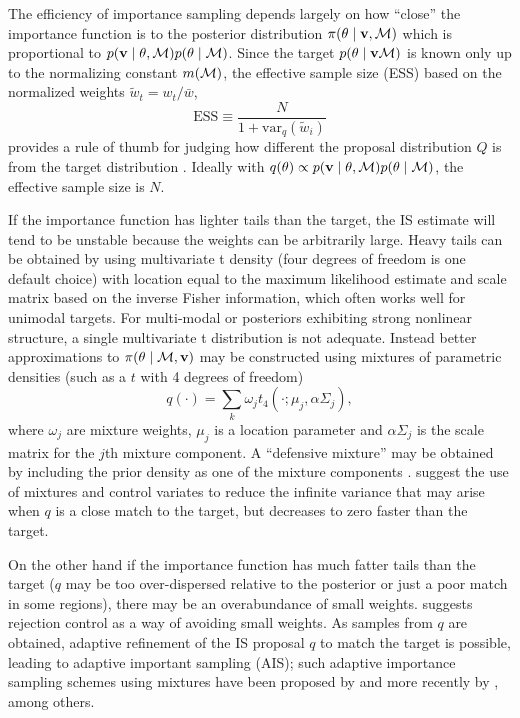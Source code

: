 The efficiency of importance sampling depends largely on how ``close'' the
importance function is to the posterior distribution $\pi(\theta \mid
\mathbf{v}, {\cal{M}})$ which is proportional to $p(\mathbf{v} \mid \theta, {\cal{M}}) p(\theta \mid
{\cal{M}})$.   Since the target $p(\theta \mid \mathbf{v}
{\cal{M}})$ is known only up to the normalizing constant $m({\cal{M}})$, the
effective sample size (ESS) based on the normalized weights
$\tilde{w}_t = w_t/ \bar{w}$,
\begin{equation}
  \label{eq:ESS}
  \text{ESS} \equiv \frac{N}{1 + \text{var}_q(\tilde{w}_i)}
\end{equation}
provides a rule of thumb for judging how different the proposal
distribution $Q$ is from the target distribution \cite[page
34]{Liu:2001}.  Ideally with $q( \theta) \propto p(\mathbf{v} \mid \theta, {\cal{M}})
p(\theta \mid {\cal{M}})$, the effective sample size is $N$.

If the importance function has lighter tails
than the target, the IS estimate will tend to be unstable because the
weights can be arbitrarily large.  Heavy tails can  be obtained
by using multivariate t density (four degrees
of freedom is one default choice) with location equal to the  maximum
likelihood  estimate and scale matrix based on the inverse Fisher
information, which often works well for unimodal targets.
For multi-modal or posteriors exhibiting strong nonlinear structure, a
single multivariate t distribution is not adequate. Instead better
approximations to $\pi(\theta \mid {\cal{M}}, \mathbf{v})$ may be constructed using mixtures of
parametric densities (such as a $t$ with 4 degrees of freedom)
\begin{equation}
  \label{eq:mixIS}
  q(\cdot) = \sum_k \omega_j t_4(\cdot; \mu_j, \alpha \Sigma_j),
\end{equation}
where $\omega_j$ are mixture weights, $\mu_j$ is a location parameter
and $\alpha \Sigma_j$ is the scale matrix for the $j$th mixture
component.  A ``defensive mixture'' may be obtained by including the
prior density as one of the mixture components \citep{Hest:1995}.
\citet{Owen:Zhou:2000} suggest the use of mixtures and control
variates to reduce the infinite variance that may arise when $q$ is a
close match to the target, but decreases to zero faster than the
target. 

On the other hand if the importance
function has much fatter tails than the target ($q$ may be too over-dispersed relative to the posterior
or just a poor match in some regions), there may be an overabundance
of small weights.  \citet{Liu:2001} suggests
rejection control as a way of avoiding small weights.  As samples from
$q$ are obtained,  adaptive refinement of the IS proposal
$q$ to match the target is possible, leading to
adaptive important sampling (AIS); such adaptive importance sampling
schemes using mixtures have been proposed by
\citet{West:1993,Oh:Berg:1992,Give:Raft:1996,Ragh:Cox:1998} and more
recently by \citet{Douc:Guil:Mari:Robe:2006}, among others.


